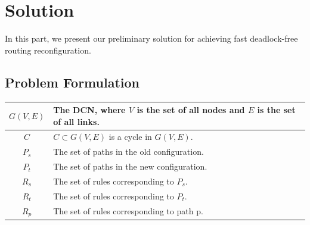\section{Solution}\label{sec:solution}

In this part, we present our preliminary solution for achieving fast deadlock-free routing reconfiguration.

\subsection{Problem Formulation}\label{subsec:formulation}

\begin{table}
\begin{tabularx}{0.48\textwidth}{ |c||X| } 
	\hline
	$G(V,E)$ & The DCN, where $V$ is the set of all nodes and $E$ is the set of all links. \\ 
	\hline
	$C$ & $C \subset G(V,E)$ is a cycle in $G(V,E)$. \\ 
	\hline
	$P_s$ & The set of paths in the old configuration. \\
	\hline
	$P_t$ & The set of paths in the new configuration. \\
	\hline
	$R_s$ & The set of rules corresponding to $P_s$. \\
	\hline
	$R_t$ & The set of rules corresponding to $P_t$. \\
	\hline
	$R_p$ & The set of rules corresponding to path p. \\
	\hline


\end{tabularx}
\end{table}
